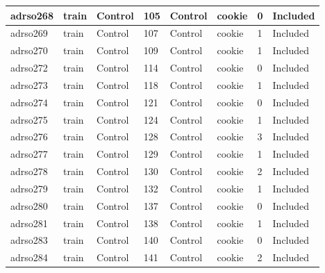 \begin{center}
\begin{longtable}{|l|l|l|l|l|l|l|l|}
adrso268  & train            & Control      & 105         & Control              & cookie          & 0                & Included      \\ \hline
adrso269  & train            & Control      & 107         & Control              & cookie          & 1                & Included      \\ \hline
adrso270  & train            & Control      & 109         & Control              & cookie          & 1                & Included      \\ \hline
adrso272  & train            & Control      & 114         & Control              & cookie          & 0                & Included      \\ \hline
adrso273  & train            & Control      & 118         & Control              & cookie          & 1                & Included      \\ \hline
adrso274  & train            & Control      & 121         & Control              & cookie          & 0                & Included      \\ \hline
adrso275  & train            & Control      & 124         & Control              & cookie          & 1                & Included      \\ \hline
adrso276  & train            & Control      & 128         & Control              & cookie          & 3                & Included      \\ \hline
adrso277  & train            & Control      & 129         & Control              & cookie          & 1                & Included      \\ \hline
adrso278  & train            & Control      & 130         & Control              & cookie          & 2                & Included      \\ \hline
adrso279  & train            & Control      & 132         & Control              & cookie          & 1                & Included      \\ \hline
adrso280  & train            & Control      & 137         & Control              & cookie          & 0                & Included      \\ \hline
adrso281  & train            & Control      & 138         & Control              & cookie          & 1                & Included      \\ \hline
adrso283  & train            & Control      & 140         & Control              & cookie          & 0                & Included      \\ \hline
adrso284  & train            & Control      & 141         & Control              & cookie          & 2                & Included      \\ \hline

\end{longtable}
\end{center}
